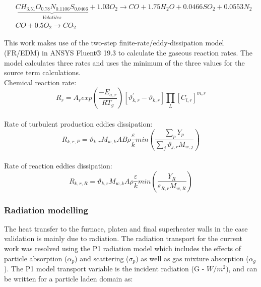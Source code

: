 \documentclass{webofc}
\begin{document}
\begin{equation}\label{eqn_volatiles}
\begin{split}
&\underbrace{CH_{3.51}O_{0.78}N_{0.1106}S_{0.0466}}_{Volatiles}+1.03O_2\to CO + 1.75H_2O + 0.0466SO_{2} + 0.0553N_2\\
&CO + 0.5O_2\to CO_2
\end{split}
\end{equation}

This work makes use of the two-step finite-rate/eddy-dissipation model (FR/EDM) in ANSYS Fluent® 19.3 \cite{ansys} to calculate the gaseous reaction rates. The model calculates three rates and uses the minimum of the three values for the source term calculations.\\

Chemical reaction rate:
\begin{equation}\label{eqn_rate_chemical}
R_{r}=A_{r}exp\left(\frac{-E_{a,r}}{RT_g}\right)\left[\vartheta^{'}_{k,r}-\vartheta_{k,r}\right]\prod_{L}\left[C_{l,r}\right]^{m,r}
\end{equation}\\
Rate of turbulent production eddies dissipation:
\begin{equation}\label{eqn_rate_products}
R_{k,r,P}=\vartheta_{k,r}M_{w,k}AB\rho\frac{\varepsilon}{k}min\left(\frac{\sum_{p} Y_p}{\sum_{j}\vartheta_{j,r}M_{w,j}}\right)
\end{equation}\\
Rate of reaction eddies dissipation:
\begin{equation}\label{eqn_rate_reactants}
R_{k,r,R}=\vartheta_{k,r}M_{w,k}A\rho\frac{\varepsilon}{k}min\left(\frac{Y_R}{\varepsilon_{R,r}M_{w,R}}\right)
\end{equation}

\subsubsection{Radiation modelling}

The heat transfer to the furnace, platen and final superheater walls in the case validation is mainly due to radiation. The radiation transport for the current work was resolved using the P1 radiation model which includes the effects of particle absorption ($\alpha_p$) and scattering ($\sigma_p$) as well as gas mixture absorption ($\alpha_g$). The P1 model transport variable is the incident radiation (G - $W/m^2$), and can be written for a particle laden domain as:
\end{document}
